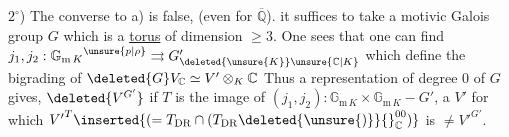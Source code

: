 $2^\circ$) The converse to a) is false,  (even for $\overline{\mathbb Q}$). it suffices to take a motivic Galois group $G$ which is a \uline{torus} of dimension $\geq 3$. One sees that one can find 
$j_1,j_2:{\mathbb G_{\mathrm m\,K}}^{\unsure{p|\rho}}\rightrightarrows G'_{\deleted{\unsure{K}}\unsure{\mathbb C|K}}$ which define  the bigrading of
$\deleted{G}V_{\mathbb C}\simeq V'\otimes_K\mathbb C$ \quad [$V'=P\mathbin{\overset{G_K}{\deleted{\unsure{\times}}}}V$, $P\unsure{\simeq|=}\underline{\operatorname{Isom}}_{\otimes}(T_{\mathrm B}\otimes K,T_{\mathrm{DR}})$]
Thus a  representation of degree 0 of $G$ gives, $\deleted{V^{G'}}$ if $T$ is the image of $(j_1,j_2):\mathbb G_{\mathrm m\,K}\times\mathbb G_{\mathrm m\,K}\mathbin{-}G'$, a $V'$ for which
${V'}^{T}\inserted{(=T_{\mathrm{DR}}\cap(T_{\mathrm{DR}}\deleted{\unsure{)}}{}_{\mathbb C}^{00})}$
 is $\ne {V'}^{G'}$.
